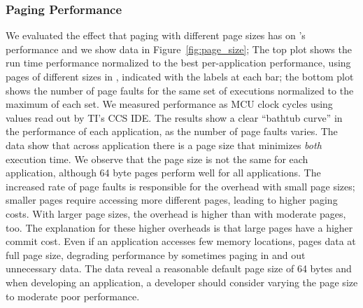 
\subsubsection{\sys Paging Performance}
\label{sec:results_memory_management}

We evaluated the effect that paging with different page sizes has on \sys's performance and we show data in Figure~\ref{fig:page_size}; The top plot shows the run time performance normalized to the best per-application performance, using pages of different sizes in \sys, indicated with the labels at each bar; the bottom plot shows the number of page faults for the same set of executions normalized to the maximum of each set. We measured performance as MCU clock cycles using values read out by TI's CCS IDE. The results show a clear ``bathtub curve'' in the performance of each application, as the number of page faults varies. The data show that across application there is a page size that minimizes \emph{both} execution time. We observe that the page size is not the same for each application, although 64 byte pages perform well for all applications. The increased rate of page faults is responsible for the overhead with small page sizes; smaller pages require accessing more different pages, leading to higher paging costs. With larger page sizes, the overhead is higher than with moderate pages, too. The explanation for these higher overheads is that large pages have a higher commit cost. Even if an application accesses few memory locations, \sys pages data at full page size, degrading performance by sometimes paging in and out unnecessary data. The data reveal a reasonable default page size of 64 bytes and when developing an application, a developer should consider varying the page size to moderate poor performance.

